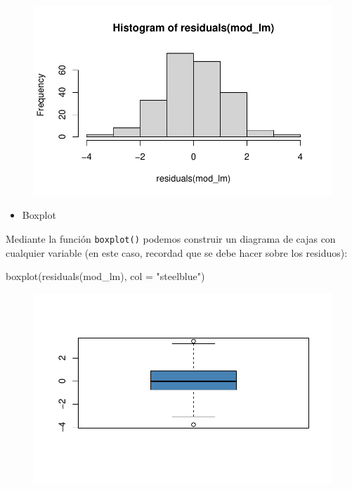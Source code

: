 \documentclass[
  letterpaper,
  DIV=11,
  numbers=noendperiod]{scrreprt}
\newenvironment{Shaded}{\begin{snugshade}}{\end{snugshade}}
\newcommand{\AttributeTok}[1]{\textcolor[rgb]{0.40,0.45,0.13}{#1}}
\newcommand{\FunctionTok}[1]{\textcolor[rgb]{0.28,0.35,0.67}{#1}}
\newcommand{\NormalTok}[1]{\textcolor[rgb]{0.00,0.23,0.31}{#1}}
\newcommand{\StringTok}[1]{\textcolor[rgb]{0.13,0.47,0.30}{#1}}
\providecommand{\tightlist}{%
  \setlength{\itemsep}{0pt}\setlength{\parskip}{0pt}}\usepackage{longtable,booktabs,array}
\begin{document}
\begin{figure}[H]

{\centering \includegraphics{01_RegresionLineal_files/figure-pdf/unnamed-chunk-32-1.pdf}

}

\end{figure}

\begin{itemize}
\tightlist
\item
  Boxplot
\end{itemize}

Mediante la función \texttt{boxplot()} podemos construir un diagrama de
cajas con cualquier variable (en este caso, recordad que se debe hacer
sobre los residuos):

\begin{Shaded}
\begin{Highlighting}[]
\FunctionTok{boxplot}\NormalTok{(}\FunctionTok{residuals}\NormalTok{(mod\_lm), }\AttributeTok{col =} \StringTok{"steelblue"}\NormalTok{)}
\end{Highlighting}
\end{Shaded}

\begin{figure}[H]

{\centering \includegraphics{01_RegresionLineal_files/figure-pdf/unnamed-chunk-33-1.pdf}

}

\end{figure}
\end{document}
